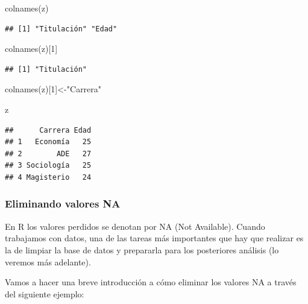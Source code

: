\documentclass[
]{book}
\newenvironment{Shaded}{\begin{snugshade}}{\end{snugshade}}
\newcommand{\DecValTok}[1]{\textcolor[rgb]{0.00,0.00,0.81}{#1}}
\newcommand{\FunctionTok}[1]{\textcolor[rgb]{0.00,0.00,0.00}{#1}}
\newcommand{\NormalTok}[1]{#1}
\newcommand{\OtherTok}[1]{\textcolor[rgb]{0.56,0.35,0.01}{#1}}
\newcommand{\StringTok}[1]{\textcolor[rgb]{0.31,0.60,0.02}{#1}}
\begin{document}
\begin{Shaded}
\begin{Highlighting}[]
\FunctionTok{colnames}\NormalTok{(z)}
\end{Highlighting}
\end{Shaded}

\begin{verbatim}
## [1] "Titulación" "Edad"
\end{verbatim}

\begin{Shaded}
\begin{Highlighting}[]
\FunctionTok{colnames}\NormalTok{(z)[}\DecValTok{1}\NormalTok{]}
\end{Highlighting}
\end{Shaded}

\begin{verbatim}
## [1] "Titulación"
\end{verbatim}

\begin{Shaded}
\begin{Highlighting}[]
\FunctionTok{colnames}\NormalTok{(z)[}\DecValTok{1}\NormalTok{]}\OtherTok{\textless{}{-}}\StringTok{"Carrera"}
\end{Highlighting}
\end{Shaded}

\begin{Shaded}
\begin{Highlighting}[]
\NormalTok{z}
\end{Highlighting}
\end{Shaded}

\begin{verbatim}
##      Carrera Edad
## 1   Economía   25
## 2        ADE   27
## 3 Sociología   25
## 4 Magisterio   24
\end{verbatim}

\hypertarget{eliminando-valores-na}{%
\subsubsection{Eliminando valores NA}\label{eliminando-valores-na}}

En R los valores perdidos se denotan por NA (Not Available). Cuando trabajamos con datos, una de las tareas más importantes que hay que realizar es la de limpiar la base de datos y prepararla para los posteriores análisis (lo veremos más adelante).

Vamos a hacer una breve introducción a cómo eliminar los valores NA a través del siguiente ejemplo:
\end{document}
